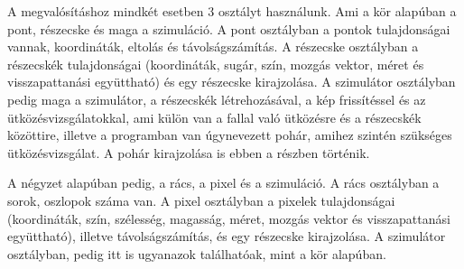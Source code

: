 A megvalósításhoz mindkét esetben 3 osztályt használunk. Ami a kör alapúban a pont, részecske és maga a szimuláció. A pont osztályban a pontok tulajdonságai vannak, koordináták, eltolás és távolságszámítás.  A részecske osztályban  a részecskék tulajdonságai (koordináták, sugár, szín, mozgás vektor, méret és visszapattanási együttható) és egy részecske kirajzolása. A szimulátor osztályban pedig maga a szimulátor, a részecskék létrehozásával, a kép frissítéssel és az ütközésvizsgálatokkal, ami külön van a fallal való ütközésre és a részecskék közöttire, illetve a programban van úgynevezett pohár, amihez szintén szükséges ütközésvizsgálat. A pohár kirajzolása is ebben a részben történik.

A négyzet alapúban pedig, a rács, a pixel és a szimuláció. A rács osztályban a sorok, oszlopok száma van. A pixel osztályban a pixelek tulajdonságai (koordináták, szín, szélesség, magasság, méret, mozgás vektor és visszapattanási együttható), illetve távolságszámítás, és egy részecske kirajzolása. A szimulátor osztályban, pedig itt is ugyanazok találhatóak, mint a kör alapúban. 

